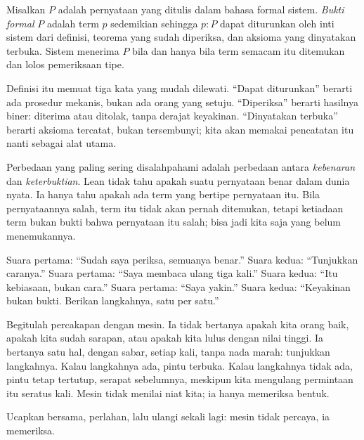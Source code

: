 
\begin{definisi}
Misalkan $P$ adalah pernyataan yang ditulis dalam bahasa formal sistem. \emph{Bukti formal} $P$
adalah term $p$ sedemikian sehingga $p:P$ dapat diturunkan oleh inti sistem dari definisi,
teorema yang sudah diperiksa, dan aksioma yang dinyatakan terbuka. Sistem menerima $P$ bila dan
hanya bila term semacam itu ditemukan dan lolos pemeriksaan tipe.
\end{definisi}

Definisi itu memuat tiga kata yang mudah dilewati. ``Dapat diturunkan'' berarti ada prosedur
mekanis, bukan ada orang yang setuju. ``Diperiksa'' berarti hasilnya biner: diterima atau
ditolak, tanpa derajat keyakinan. ``Dinyatakan terbuka'' berarti aksioma tercatat, bukan
tersembunyi; kita akan memakai pencatatan itu nanti sebagai alat utama.

Perbedaan yang paling sering disalahpahami adalah perbedaan antara \emph{kebenaran} dan
\emph{keterbuktian}. Lean tidak tahu apakah suatu pernyataan benar dalam dunia nyata. Ia hanya
tahu apakah ada term yang bertipe pernyataan itu. Bila pernyataannya salah, term itu tidak akan
pernah ditemukan, tetapi ketiadaan term bukan bukti bahwa pernyataan itu salah; bisa jadi kita
saja yang belum menemukannya.

\begin{bacakeras}
Suara pertama: ``Sudah saya periksa, semuanya benar.''
Suara kedua: ``Tunjukkan caranya.''
Suara pertama: ``Saya membaca ulang tiga kali.''
Suara kedua: ``Itu kebiasaan, bukan cara.''
Suara pertama: ``Saya yakin.''
Suara kedua: ``Keyakinan bukan bukti. Berikan langkahnya, satu per satu.''

Begitulah percakapan dengan mesin. Ia tidak bertanya apakah kita orang baik, apakah kita sudah
sarapan, atau apakah kita lulus dengan nilai tinggi. Ia bertanya satu hal, dengan sabar, setiap
kali, tanpa nada marah: tunjukkan langkahnya. Kalau langkahnya ada, pintu terbuka. Kalau langkahnya
tidak ada, pintu tetap tertutup, serapat sebelumnya, meskipun kita mengulang permintaan itu seratus
kali. Mesin tidak menilai niat kita; ia hanya memeriksa bentuk.

Ucapkan bersama, perlahan, lalu ulangi sekali lagi: mesin tidak percaya, ia memeriksa.
\end{bacakeras}

